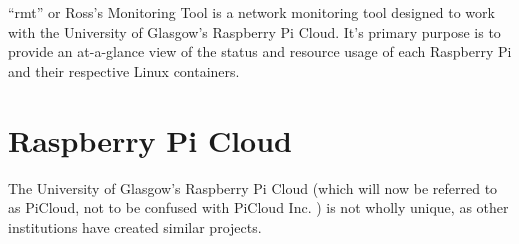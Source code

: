 ``rmt'' or Ross's Monitoring Tool is a network monitoring tool 
designed to work with the University of Glasgow's Raspberry Pi 
Cloud. It's primary purpose is to provide an at-a-glance view of the 
status and resource usage of each Raspberry Pi and their respective 
Linux containers.

\section{Raspberry Pi Cloud}
\label{intro:picloud}

The University of Glasgow's Raspberry Pi Cloud \citep{glapicloud, picloudblog} (which will now be 
referred to as PiCloud, not to be confused with PiCloud Inc. \citeyearpar{picloudinc}) is not 
wholly unique, as other institutions have created similar projects.

